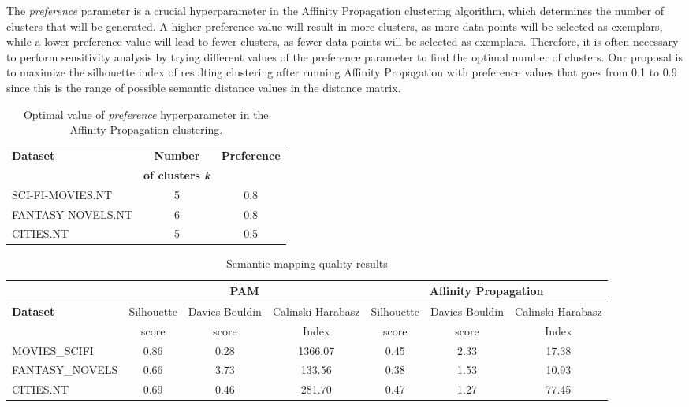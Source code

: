 \documentclass{ieeeaccess}
\begin{document}
The \textit{preference} parameter is a crucial hyperparameter in the Affinity 
Propagation clustering algorithm, which determines the number of clusters
that will be generated. A higher preference value will result in more 
clusters, as more data points will be selected as exemplars, while a lower 
preference value will lead to fewer clusters, as fewer data points will be 
selected as exemplars. Therefore, it is often necessary to perform
sensitivity analysis by trying different values of the preference parameter 
to find the optimal number of clusters. Our proposal is to maximize the
silhouette index of resulting clustering after running Affinity Propagation 
with preference values that goes from 0.1 to 0.9 since this is the range of 
possible semantic distance values in the distance matrix. 

\begin{table}[!htb]
    \caption{Optimal value of \textit{preference} hyperparameter 
    in the Affinity Propagation clustering.}
    \label{tab:preference_numbers}
    \centering
    \begin{tabular}{lcc}
         \toprule
         \textbf{Dataset} & 
         \textbf{Number} &
         \textbf{Preference}
         \\
         & \textbf{of clusters \textit{k}} & \\
         \midrule
         SCI-FI-MOVIES.NT & 5 & 0.8 \\ 
         FANTASY-NOVELS.NT & 6 & 0.8 \\
         CITIES.NT & 5 & 0.5 \\
         \bottomrule
    \end{tabular}
\end{table}



\begin{table*}[!htb]
\caption{Semantic mapping quality results}
\label{table}
\centering
\begin{tabular}{lcccccc}
\toprule
& \multicolumn{3}{c}{PAM} 
& \multicolumn{3}{c}{Affinity Propagation} \\
\hline
\textbf{Dataset} & 
\footnotesize
Silhouette & 
\footnotesize
Davies-Bouldin & 
\footnotesize
Calinski-Harabasz &
\footnotesize
Silhouette & 
\footnotesize
Davies-Bouldin & 
\footnotesize
Calinski-Harabasz \\
& 
\footnotesize
score 
&
\footnotesize
score &
\footnotesize
Index &
\footnotesize
score &
\footnotesize
score &
\footnotesize
Index \\
\hline
MOVIES\_SCIFI & 0.86 & 0.28 & 1366.07 & 0.45 & 2.33 & 17.38 \\
FANTASY\_NOVELS  & 0.66 & 3.73 & 133.56 & 0.38 & 1.53 & 10.93 \\
CITIES.NT & 0.69 & 0.46 & 281.70 & 0.47 & 1.27 & 77.45 \\

\bottomrule
\end{tabular}
\label{tab1}
\end{table*}
\end{document}
